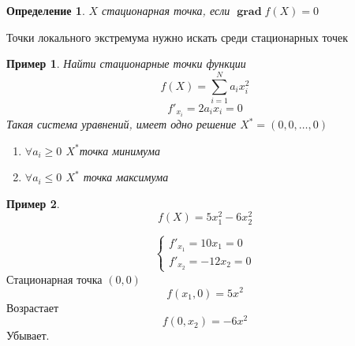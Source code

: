 \documentclass[14pt]{extarticle}
\newtheorem{example}{Пример}
\newtheorem{definiiton}{Определение}
\DeclareMathOperator{\grad}{\textbf{grad}}
\begin{document}
	\begin{definiiton}
		$X$ стационарная точка, если  $\grad f(X) = 0$
	\end{definiiton}
	Точки локального экстремума нужно искать среди стационарных точек
	\begin{example}
		Найти стационарные точки функции
		\begin{equation}
			f(X) = \sum_{i = 1}^{N} a_i x_{i}^2
		\end{equation}
		\begin{equation}
			f'_{x_{i}} = 2a_{i} x_{i} = 0
		\end{equation}
		Такая система уравнений, имеет одно решение $X^{*}=  (0,0,\dots,0)$
		 \begin{enumerate}
			\item $\forall a_{i} \ge 0$ $X^{*}$точка минимума
			\item $\forall a_{i} \le 0$ $X^{*}$ точка максимума
		\end{enumerate}
	\end{example}
	\begin{example}
		\begin{equation}
			f(X) = 5x_1^{2} - 6x_2^{2}
		\end{equation}
	\end{example}
	\begin{equation}
		\begin{cases}
			f'_{x_1} = 10x_1 = 0\\
			f'_{x_2} = -12 x_2 = 0
		\end{cases}
	\end{equation}
	Стационарная точка $(0,0)$
	 \begin{equation}
		f(x_1,0) = 5x^2
	\end{equation}
	Возрастает
	\begin{equation}
		f(0,x_2) = -6x^2
	\end{equation}
	Убывает.
\end{document}
